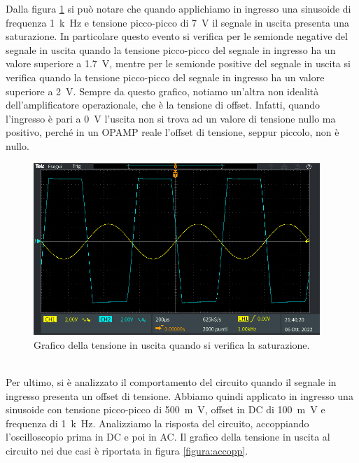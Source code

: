 \documentclass{report}
\begin{document}
Dalla figura \ref{figura:satur} si può notare che quando applichiamo in ingresso una sinusoide di frequenza \SI{1}{k\hertz} e tensione picco-picco di \SI{7}{\volt} il segnale in uscita presenta una saturazione. In particolare questo evento si verifica per le semionde negative del segnale in uscita quando la tensione picco-picco del segnale in ingresso ha un valore superiore a \SI{1.7}{\volt}, mentre per le semionde positive del segnale in uscita si verifica quando la tensione picco-picco del segnale in ingresso ha un valore superiore a \SI{2}{\volt}. Sempre da questo grafico, notiamo un'altra non idealità dell'amplificatore operazionale, che è la tensione di offset. Infatti, quando l'ingresso è pari a \SI{0}{\volt} l'uscita non si trova ad un valore di tensione nullo ma positivo, perché in un OPAMP reale l'offset di tensione, seppur piccolo, non è nullo. %
\begin{figure}[h!]
	\centering
	\includegraphics[height=6.5cm]{immagini/TEK00015}
	\caption{Grafico della tensione in uscita quando si verifica la saturazione.}
	\label{figura:satur}
\end{figure}
\\Per ultimo, si è analizzato il comportamento del circuito quando il segnale in ingresso presenta un offset di tensione. Abbiamo quindi applicato in ingresso una sinusoide con tensione picco-picco di \SI{500}{m\volt}, offset in DC di \SI{+100}{m\volt} e  frequenza di \SI{1}{k\hertz}. Analizziamo la risposta del circuito, accoppiando l'oscilloscopio prima in DC e poi in AC. Il grafico della tensione in uscita al circuito nei due casi è riportata in figura \ref{figura:accopp}. \par
\end{document}
